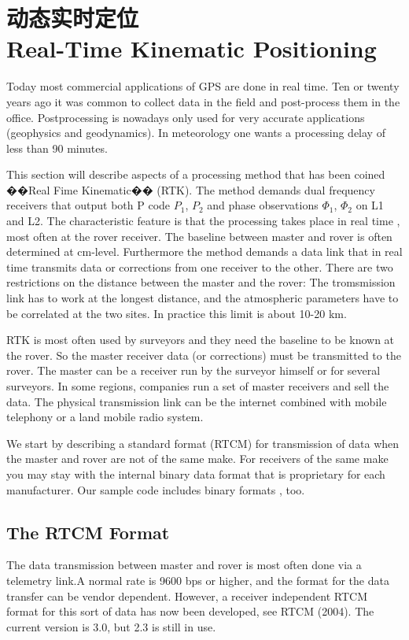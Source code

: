 \section[动态实时定位]{动态实时定位\\Real-Time Kinematic Positioning}
Today most commercial applications of GPS are done in real time. Ten or twenty years ago it was common to collect data in the field and post-process them in the office. Postprocessing is nowadays only used for very accurate applications (geophysics and geodynamics). In meteorology one wants a processing delay of less than 90 minutes.

This section will describe aspects of a processing method that has been coined ��Real
Fime Kinematic�� (RTK). The method demands dual frequency receivers that output both
P code $P_{1}$, $P_{2}$ and phase observations $\Phi_{1}$, $\Phi_{2}$ on L1 and L2. The characteristic feature is that the processing takes place in real time , most often at the rover receiver. The baseline between master and rover is often determined at cm-level. Furthermore the method demands a data link that in real time transmits data or corrections from one receiver to the other. There are two restrictions on the distance between the master and the rover: The tromsmission link has to work at the longest distance, and the atmospheric parameters have to be correlated at the two sites. In practice this limit is about 10-20 km.

RTK is most often used by surveyors and they need the baseline to be known at the rover. So the master receiver data (or corrections) must be transmitted to the rover. The master can be a receiver run by the surveyor himself or for several surveyors. In some regions, companies run a set of master receivers and sell the data. The physical transmission link can be the internet combined with mobile telephony or a land mobile radio system.

We start by describing a standard format (RTCM) for transmission of data when the master and rover are not of the same make. For receivers of the same make you may stay with the internal binary data format that is proprietary for each manufacturer. Our sample
code includes binary formats , too.

\subsection{The RTCM Format}

The data transmission between master and rover is most often done via a telemetry link.A normal rate is 9600 bps or higher, and the format for the data transfer can be vendor dependent. However, a receiver independent RTCM format for this sort of data has now been developed, see RTCM (2004). The current version is 3.0, but 2.3 is still in use.

